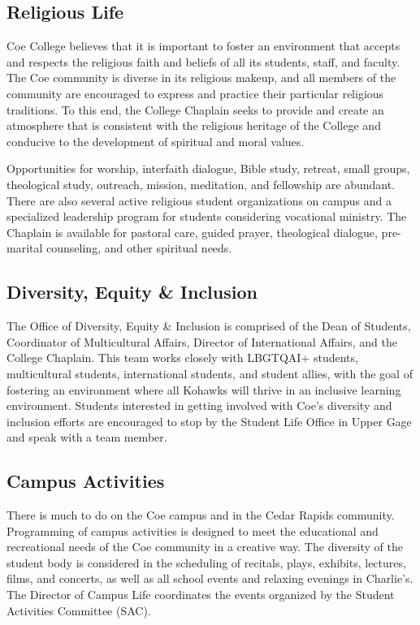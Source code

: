 \documentclass[
  letterpaper,
]{scrbook}
\begin{document}
\subsection{Religious Life}\label{religious-life}

Coe College believes that it is important to foster an environment that
accepts and respects the religious faith and beliefs of all its
students, staff, and faculty. The Coe community is diverse in its
religious makeup, and all members of the community are encouraged to
express and practice their particular religious traditions. To this end,
the College Chaplain seeks to provide and create an atmosphere that is
consistent with the religious heritage of the College and conducive to
the development of spiritual and moral values.

Opportunities for worship, interfaith dialogue, Bible study, retreat,
small groups, theological study, outreach, mission, meditation, and
fellowship are abundant. There are also several active religious student
organizations on campus and a specialized leadership program for
students considering vocational ministry. The Chaplain is available for
pastoral care, guided prayer, theological dialogue, pre-marital
counseling, and other spiritual needs.

\subsection{Diversity, Equity \&
Inclusion}\label{diversity-equity-inclusion}

The Office of Diversity, Equity \& Inclusion is comprised of the Dean of
Students, Coordinator of Multicultural Affairs, Director of
International Affairs, and the College Chaplain. This team works closely
with LBGTQAI+ students, multicultural students, international students,
and student allies, with the goal of fostering an environment where all
Kohawks will thrive in an inclusive learning environment. Students
interested in getting involved with Coe's diversity and inclusion
efforts are encouraged to stop by the Student Life Office in Upper Gage
and speak with a team member.

\subsection{Campus Activities}\label{campus-activities}

There is much to do on the Coe campus and in the Cedar Rapids community.
Programming of campus activities is designed to meet the educational and
recreational needs of the Coe community in a creative way. The diversity
of the student body is considered in the scheduling of recitals, plays,
exhibits, lectures, films, and concerts, as well as all school events
and relaxing evenings in Charlie's. The Director of Campus Life
coordinates the events organized by the Student Activities Committee
(SAC).
\end{document}
